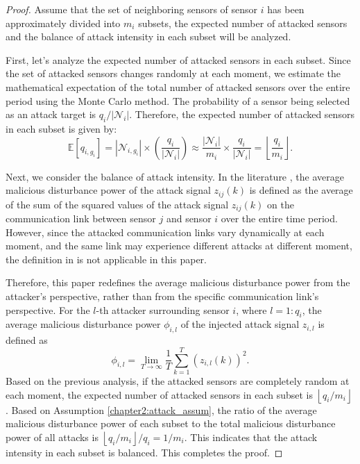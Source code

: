 \begin{proof}
    Assume that the set of neighboring sensors of sensor $i$ has been approximately divided into $m_i$ subsets,  the expected number of attacked sensors and the balance of attack intensity in each subset will be analyzed.

First, let's analyze the expected number of attacked sensors in each subset. Since the set of attacked sensors changes randomly at each moment, we estimate the mathematical expectation of the total number of attacked sensors over the entire period using the Monte Carlo method. The probability of a sensor being selected as an attack target is $q_i / |\mathcal{N}_i|$. Therefore, the expected number of attacked sensors in each subset is given by:
\[
\mathbb{E}[q_{i,g_i}] = |\mathcal{N}_{i,g_i}| \times \left( \frac{q_i}{|\mathcal{N}_i|} \right) \approx \frac{|\mathcal{N}_i|}{m_i} \times \frac{q_i}{|\mathcal{N}_i|} = \left\lfloor \frac{q_i}{m_i} \right\rfloor.
\]

Next, we consider the balance of attack intensity. In the literature \cite{Suo2024attack}, the average malicious disturbance power of the attack signal $z_{ij}(k)$ is defined as the average of the sum of the squared values of the attack signal $z_{ij}(k)$ on the communication link between sensor $j$ and sensor $i$ over the entire time period. However, since the attacked communication links vary dynamically at each moment, and the same link may experience different attacks at different moment, the definition in \cite{Suo2024attack} is not applicable in this paper.

Therefore, this paper redefines the average malicious disturbance power from the attacker's perspective, rather than from the specific communication link's perspective. For the $l$-th attacker surrounding sensor $i$, where $l=1:q_i$, the average malicious disturbance power $\phi_{i,l}$ of the injected attack signal $z_{i,l}$ is defined as
\begin{equation}
\phi_{i,l} = \lim_{T \to \infty} \frac{1}{T} \sum_{k=1}^T \left( z_{i,l}(k) \right)^2.
\end{equation}
Based on the previous analysis, if the attacked sensors are completely random at each moment, the expected number of attacked sensors in each subset is $\left\lfloor q_i/{m_i} \right\rfloor$. Based on Assumption \ref{chapter2:attack_assum}, the ratio of the average malicious disturbance power of each subset to the total malicious disturbance power of all attacks is $\left\lfloor q_i/m_i \right\rfloor/q_i= 1/m_i
$.
This indicates that the attack intensity in each subset is balanced. This completes the proof.
\end{proof}

